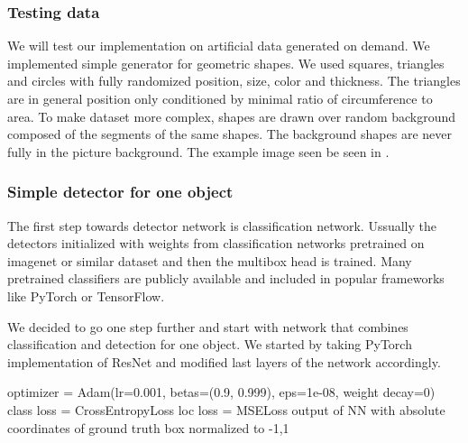 \subsubsection{Testing data}
We will test our implementation on artificial data generated on demand. We implemented simple generator for geometric shapes. We used squares, triangles and circles with fully randomized position, size, color and thickness. The triangles are in general position only conditioned by minimal ratio of circumference to area.
To make dataset more complex, shapes are drawn over random background composed of the segments of the same shapes. The background shapes are never fully in the picture background. The example image seen be seen in .






\subsubsection{Simple detector for one object}
The first step towards detector network is classification network. Ussually the detectors initialized with weights from classification networks pretrained on imagenet or similar dataset and then the multibox head is trained. Many pretrained classifiers are publicly available and included in popular frameworks like PyTorch or TensorFlow.

We decided  to go one step further and start with network that combines classification and detection for one object. We started by taking PyTorch implementation of ResNet and modified last layers of the network accordingly. 


optimizer = Adam(lr=0.001, betas=(0.9, 0.999), eps=1e-08, weight decay=0)
class loss = CrossEntropyLoss
loc loss = MSELoss output of NN with absolute coordinates of ground truth box normalized to -1,1 

